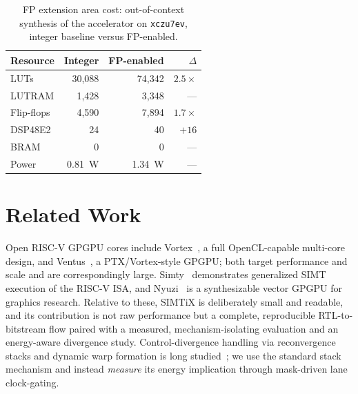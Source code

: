 \documentclass[conference]{IEEEtran}
\begin{document}
\begin{table}[t]
\caption{FP extension area cost: out-of-context synthesis of the accelerator on
\texttt{xczu7ev}, integer baseline versus FP-enabled.}
\label{tab:fppa}
\centering
\footnotesize
\begin{tabular}{lrrr}
\toprule
Resource & Integer & FP-enabled & $\Delta$\\
\midrule
LUTs            & 30{,}088 & 74{,}342 & $2.5\times$\\
\quad LUTRAM    & 1{,}428  & 3{,}348  & ---\\
Flip-flops      & 4{,}590  & 7{,}894  & $1.7\times$\\
DSP48E2         & 24       & 40       & $+16$\\
BRAM            & 0        & 0        & ---\\
Power           & 0.81~W   & 1.34~W   & ---\\
\bottomrule
\end{tabular}
\end{table}

\section{Related Work}\label{sec:related}
Open RISC-V GPGPU cores include Vortex~\cite{vortex}, a full OpenCL-capable
multi-core design, and Ventus~\cite{ventus}, a PTX/Vortex-style GPGPU; both
target performance and scale and are correspondingly large. Simty~\cite{simty}
demonstrates generalized SIMT execution of the RISC-V ISA, and
Nyuzi~\cite{nyuzi} is a synthesizable vector GPGPU for graphics research.
Relative to these, SIMTiX is deliberately small and readable, and its
contribution is not raw performance but a complete, reproducible RTL-to-bitstream
flow paired with a measured, mechanism-isolating evaluation and an energy-aware
divergence study. Control-divergence handling via reconvergence stacks and
dynamic warp formation is long studied~\cite{fung,tesla}; we use the standard
stack mechanism and instead \emph{measure} its energy implication through
mask-driven lane clock-gating.

\end{document}
